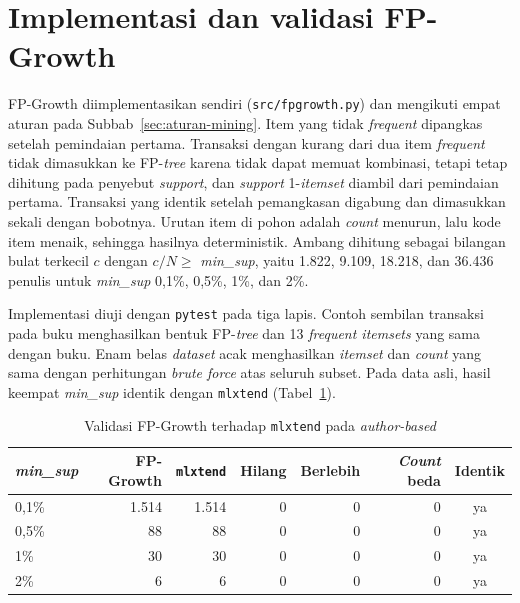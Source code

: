 
\section{Implementasi dan validasi FP-Growth}
\label{sec:hasil-t4-fp-validasi}
FP-Growth diimplementasikan sendiri (\texttt{src/fpgrowth.py}) dan mengikuti empat aturan pada Subbab~\ref{sec:aturan-mining}. Item yang tidak \textit{frequent} dipangkas setelah pemindaian pertama. Transaksi dengan kurang dari dua item \textit{frequent} tidak dimasukkan ke FP-\textit{tree} karena tidak dapat memuat kombinasi, tetapi tetap dihitung pada penyebut \textit{support}, dan \textit{support} 1-\textit{itemset} diambil dari pemindaian pertama. Transaksi yang identik setelah pemangkasan digabung dan dimasukkan sekali dengan bobotnya. Urutan item di pohon adalah \textit{count} menurun, lalu kode item menaik, sehingga hasilnya deterministik. Ambang dihitung sebagai bilangan bulat terkecil $c$ dengan $c/N \ge$ \textit{min\_sup}, yaitu 1.822, 9.109, 18.218, dan 36.436 penulis untuk \textit{min\_sup} 0,1\%, 0,5\%, 1\%, dan 2\%.

Implementasi diuji dengan \texttt{pytest} pada tiga lapis. Contoh sembilan transaksi pada buku \textcite{han2012} menghasilkan bentuk FP-\textit{tree} dan 13 \textit{frequent itemsets} yang sama dengan buku. Enam belas \textit{dataset} acak menghasilkan \textit{itemset} dan \textit{count} yang sama dengan perhitungan \textit{brute force} atas seluruh subset. Pada data asli, hasil keempat \textit{min\_sup} identik dengan \texttt{mlxtend} \cite{raschka2018} (Tabel~\ref{tab:t4-validasi}).

\begin{table}[ht]
\caption{Validasi FP-Growth terhadap \texttt{mlxtend} pada \textit{author-based}}
\label{tab:t4-validasi}
\small
\begin{tabular}{@{}lrrrrrc@{}}
\toprule
\textbf{\textit{min\_sup}} & \textbf{FP-Growth} & \textbf{\texttt{mlxtend}} & \textbf{Hilang} & \textbf{Berlebih} & \textbf{\textit{Count} beda} & \textbf{Identik} \\
\midrule
0,1\% & 1.514 & 1.514 & 0 & 0 & 0 & ya \\
0,5\% & 88 & 88 & 0 & 0 & 0 & ya \\
1\% & 30 & 30 & 0 & 0 & 0 & ya \\
2\% & 6 & 6 & 0 & 0 & 0 & ya \\
\bottomrule
\end{tabular}
\end{table}

